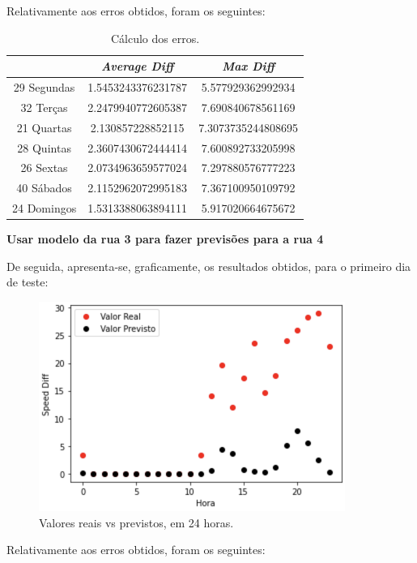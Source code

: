 \documentclass[a4paper, 12pt]{article}
\begin{document}
Relativamente aos erros obtidos, foram os seguintes:

\begin{table}[H]
	\centering
	\begin{tabular}{||c||c|c||}
		\hline\hline
		& \textit{Average Diff} & \textit{Max Diff} \\
		\hline\hline
		29 Segundas & 
1.5453243376231787
 & 5.577929362992934\\
		\hline
		32 Terças  &
2.2479940772605387
 & 7.690840678561169 \\
		\hline
		21 Quartas & 
2.130857228852115
 & 7.3073735244808695 \\
		\hline
		28 Quintas  & 2.3607430672444414

 & 7.600892733205998 \\
		\hline
		26 Sextas & 
2.0734963659577024 & 7.297880576777223 \\
		\hline
		40 Sábados  & 2.1152962072995183
& 7.367100950109792 \\
		\hline
		24 Domingos & 
1.5313388063894111
 & 5.917020664675672
 \\
		\hline\hline
	\end{tabular}
	\label{table:mod3_rua2}
	\caption{Cálculo dos erros.}
\end{table}

\vspace{0.5cm}
\textbf{Usar modelo da rua 3 para fazer previsões para a rua 4}

De seguida, apresenta-se, graficamente, os resultados obtidos, para o primeiro dia de teste:

\begin{figure}[H]
	\centering
	\includegraphics[width=10cm]{resultados/real_prev_mod1_rua4.png}
	\caption{Valores reais vs previstos, em 24 horas.}
\end{figure}

Relativamente aos erros obtidos, foram os seguintes:
\end{document}

